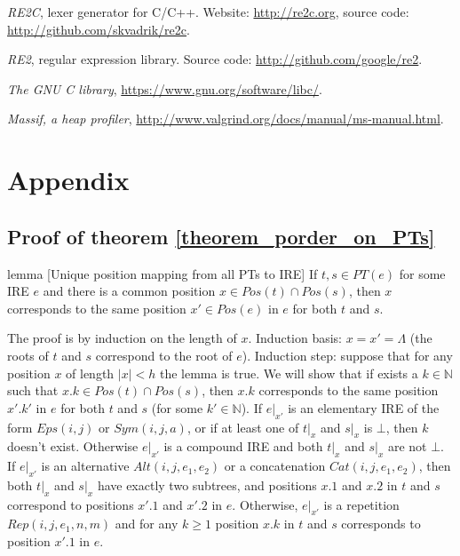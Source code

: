 \documentclass[AMA,STIX1COL]{WileyNJD-v2}
\newcommand{\YN}{\mathbb{N}}
\newcommand{\Eps}{E\!ps}
\newcommand{\Sym}{S\!ym}
\newcommand{\Alt}{Alt}
\newcommand{\Cat}{C\!at}
\newcommand{\Rep}{Rep}
\begin{document}
\begin{thebibliography}{99}
    \textit{RE2C}, lexer generator for C/C++.
    Website: \url{http://re2c.org},
    source code: \url{http://github.com/skvadrik/re2c}.

    \textit{RE2}, regular expression library.
    Source code: \url{http://github.com/google/re2}.

    \textit{The GNU C library},
    \url{https://www.gnu.org/software/libc/}.

    \textit{Massif, a heap profiler},
    \url{http://www.valgrind.org/docs/manual/ms-manual.html}.

\end{thebibliography}


\vfill\null
\clearpage


\section*{Appendix}

\subsection*{Proof of theorem \ref{theorem_porder_on_PTs}}

\begin{theoremEnd}{lemma}
[Unique position mapping from all PTs to IRE]
    \label{lemma_positions}
    If $t, s \in PT(e)$ for some IRE $e$
    and there is a common position $x \in Pos(t) \cap Pos(s)$,
    then $x$ corresponds to the same position $x' \in Pos(e)$ in $e$ for both $t$ and $s$.
\end{theoremEnd}
\begin{proofEnd}
    The proof is by induction on the length of $x$.
    Induction basis: $x = x' = \Lambda$ (the roots of $t$ and $s$ correspond to the root of $e$).
    Induction step: suppose that for any position $x$ of length $|x| < h$ the lemma is true.
    We will show that if exists a $k \in \YN$ such that $x.k \in Pos(t) \cap Pos(s)$,
    then $x.k$ corresponds to the same position $x'.k'$ in $e$ for both $t$ and $s$ (for some $k' \in \YN$).
    If $e|_{x'}$ is an elementary IRE of the form $\Eps(i, j)$ or $\Sym(i, j, a)$,
    or if at least one of $t|_x$ and $s|_x$ is $\bot$,
    then $k$ doesn't exist.
    Otherwise $e|_{x'}$ is a compound IRE and both $t|_x$ and $s|_x$ are not $\bot$.
    If $e|_{x'}$ is an alternative $\Alt(i, j, e_1, e_2)$
    or a concatenation $\Cat(i, j, e_1, e_2)$,
    then both $t|_x$ and $s|_x$ have exactly two subtrees,
    and positions $x.1$ and $x.2$ in $t$ and $s$ correspond to positions $x'.1$ and $x'.2$ in $e$.
    Otherwise, $e|_{x'}$ is a repetition $\Rep(i, j, e_1, n, m)$
    and for any $k \geq 1$ position $x.k$ in $t$ and $s$ corresponds to position $x'.1$ in $e$.
\end{proofEnd}
\end{document}
